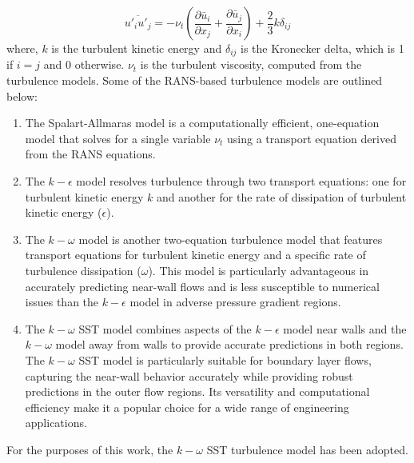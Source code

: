 \begin{equation}
\overline{u'_i u'_j} = - \nu_t \left( \frac{\partial \bar{u}_i}{\partial x_j} + \frac{\partial \bar{u}_j}{\partial x_i} \right) + \frac{2}{3} k \delta_{ij}
\end{equation}
where, $k$ is the turbulent kinetic energy and $\delta_{ij}$ is the Kronecker delta, which is 1 if $i = j$ and 0 otherwise. $\nu_t$ is the turbulent viscosity, computed from the turbulence models. Some of the RANS-based turbulence models are outlined below: 
\begin{enumerate}
  \item The Spalart-Allmaras model is a computationally efficient, one-equation model that solves for a single variable $\nu_t$ using a transport equation derived from the RANS equations. 
  \item The $k-\epsilon$ model resolves turbulence through two transport equations: one for turbulent kinetic energy $k$ and another for the rate of dissipation of turbulent kinetic energy ($\epsilon$). 
  \item The $k-\omega$ model is another two-equation turbulence model that features transport equations for turbulent kinetic energy and a specific rate of turbulence dissipation ($\omega$). This model is particularly advantageous in accurately predicting near-wall flows and is less susceptible to numerical issues than the $k-\epsilon$ model in adverse pressure gradient regions. 
  \item The $k-\omega$  \gls{SST} model combines aspects of the $k-\epsilon$ model near walls and the $k-\omega$ model away from walls to provide accurate predictions in both regions. The $k-\omega$ SST model is particularly suitable for boundary layer flows, capturing the near-wall behavior accurately while providing robust predictions in the outer flow regions. Its versatility and computational efficiency make it a popular choice for a wide range of engineering applications.
\end{enumerate}
For the purposes of this work, the $k-\omega$ SST turbulence model has been adopted.
